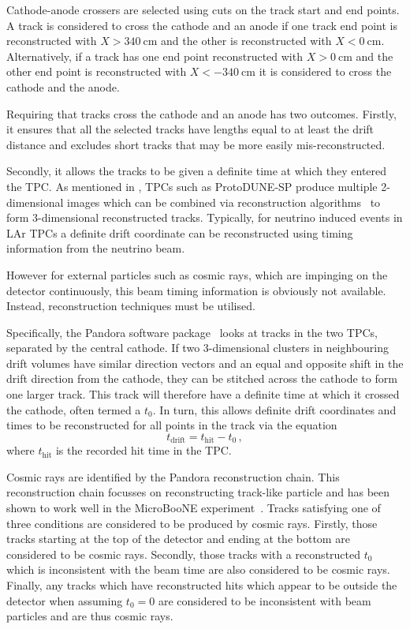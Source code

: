 Cathode-anode crossers are selected using cuts on the track start and end points. 
A track is considered to cross the cathode and an anode if one track end point is reconstructed with $X > \SI{340}{\cm}$ and the other is reconstructed with $X < \SI{0}{\cm}$.
Alternatively, if a track has one end point reconstructed with $X > \SI{0}{\cm}$ and the other end point is reconstructed with $X < \SI{-340}{\cm}$ it is considered to cross the cathode and the anode.

Requiring that tracks cross the cathode and an anode has two outcomes.
Firstly, it ensures that all the selected tracks have lengths equal to at least the drift distance and excludes short tracks that may be more easily mis-reconstructed.

Secondly, it allows the tracks to be given a definite time at which they entered the TPC.
As mentioned in , TPCs such as ProtoDUNE-SP produce multiple 2-dimensional images which can be combined via reconstruction algorithms~\cite{pandora} to form 3-dimensional reconstructed tracks.
Typically, for neutrino induced events in LAr TPCs a definite drift coordinate can be reconstructed using timing information from the neutrino beam.

However for external particles such as cosmic rays, which are impinging on the detector continuously, this beam timing information is obviously not available.
Instead, reconstruction techniques must be utilised.

Specifically, the Pandora software package~\cite{pandora} looks at tracks in the two TPCs, separated by the central cathode.
If two 3-dimensional clusters in neighbouring drift volumes have similar direction vectors and an equal and opposite shift in the drift direction from the cathode, they can be stitched across the cathode to form one larger track.
This track will therefore have a definite time at which it crossed the cathode, often termed a $t_{0}$.
In turn, this allows definite drift coordinates and times to be reconstructed for all points in the track via the equation
\begin{equation}
	t_{\text{drift}} = t_{\text{hit}} - t_{0} \, ,
\end{equation}
where $t_{\text{hit}}$ is the recorded hit time in the TPC.

Cosmic rays are identified by the Pandora reconstruction chain. 
This reconstruction chain focusses on reconstructing track-like particle and has been shown to work well in the MicroBooNE experiment~\cite{pandoraUboone}. 
Tracks satisfying one of three conditions are considered to be produced by cosmic rays.
Firstly, those tracks starting at the top of the detector and ending at the bottom are considered to be cosmic rays.
Secondly, those tracks with a reconstructed $t_{0}$ which is inconsistent with the beam time are also considered to be cosmic rays.
Finally, any tracks which have reconstructed hits which appear to be outside the detector when assuming $t_0 = 0$ are considered to be inconsistent with beam particles and are thus cosmic rays.

